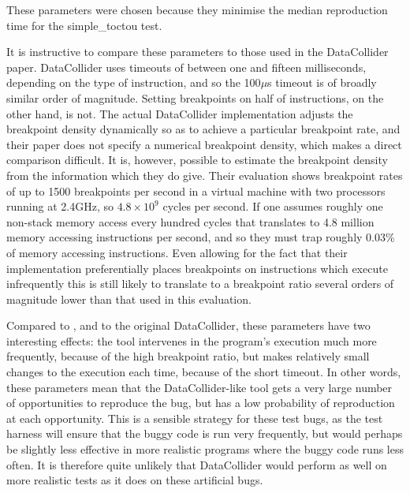 These parameters were chosen because they minimise the median
reproduction time for the simple\_toctou test.

It is instructive to compare these parameters to those used in the
DataCollider paper.  DataCollider uses timeouts of between one and
fifteen milliseconds, depending on the type of instruction, and so the
100$\mu$s timeout is of broadly similar order of magnitude.  Setting
breakpoints on half of instructions, on the other hand, is not.  The
actual DataCollider implementation adjusts the breakpoint density
dynamically so as to achieve a particular breakpoint rate, and their
paper does not specify a numerical breakpoint density, which makes a
direct comparison difficult.  It is, however, possible to estimate the
breakpoint density from the information which they do give.  Their
evaluation shows breakpoint rates of up to 1500 breakpoints per second
in a virtual machine with two processors running at 2.4GHz, so $4.8
\times 10^9$ cycles per second.  If one assumes roughly one non-stack
memory access every hundred cycles that translates to 4.8 million
memory accessing instructions per second, and so they must trap
roughly 0.03\% of memory accessing instructions.  Even allowing for
the fact that their implementation preferentially places breakpoints
on instructions which execute infrequently this is still likely to
translate to a breakpoint ratio several orders of magnitude lower than
that used in this evaluation.

Compared to {\technique}, and to the original DataCollider, these
parameters have two interesting effects: the tool intervenes in the
program's execution much more frequently, because of the high
breakpoint ratio, but makes relatively small changes to the execution
each time, because of the short timeout.  In other words, these
parameters mean that the DataCollider-like tool gets a very large
number of opportunities to reproduce the bug, but has a low
probability of reproduction at each opportunity.  This is a sensible
strategy for these test bugs, as the test harness will ensure that the
buggy code is run very frequently, but would perhaps be slightly less
effective in more realistic programs where the buggy code runs less
often.  It is therefore quite unlikely that DataCollider would perform
as well on more realistic tests as it does on these artificial bugs.


